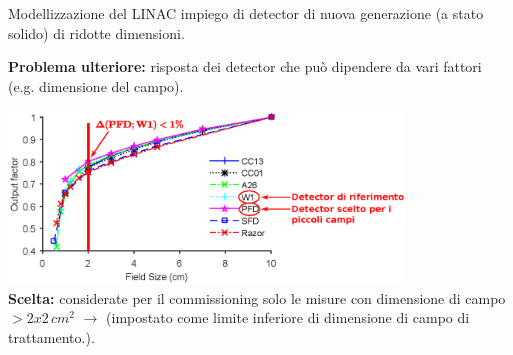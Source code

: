 \documentclass{beamer}
\begin{document}
\begin{frame}[t]{Modellizzazione del LINAC}
\footnotesize
{} impiego di detector di nuova generazione (a stato solido) di ridotte dimensioni.\\ \vspace{.5cm}

\alert{\bf Problema ulteriore:} risposta dei detector che può dipendere da vari fattori (e.g. dimensione del campo).\\ \vspace{.3cm}

\includegraphics[height=4.6cm]{./img/OF_MOD.eps}\\\vspace{.2cm}
{\scriptsize \color{Dgreen} \textbf{Scelta:} considerate per il commissioning solo le misure con dimensione di campo $> 2x2\,cm^2$ $\rightarrow$ (impostato come limite inferiore di dimensione di campo di trattamento.).}

\end{frame}
\end{document}
